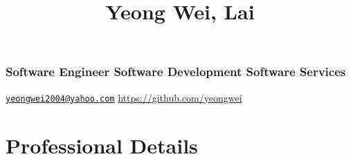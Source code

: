 \documentclass[
]{article}
\title{Yeong Wei, Lai}
\author{}
\date{\vspace{-2.5em}}
\begin{document}
\maketitle

\hypertarget{software-engineer-software-development-software-services}{%
\subsubsection{Software Engineer \textbar{} Software Development
\textbar{} Software
Services}\label{software-engineer-software-development-software-services}}

\href{mailto:yeongwei2004@yahoo.com}{\nolinkurl{yeongwei2004@yahoo.com}}
\textbar{} \url{https://github.com/yeongwei}

\hypertarget{professional-details}{%
\section{Professional Details}\label{professional-details}}
\end{document}
